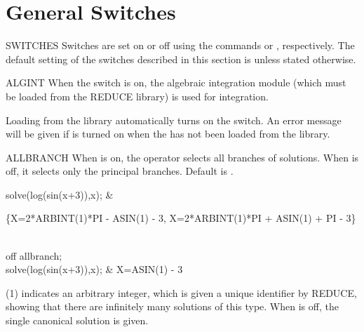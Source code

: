 \section{General Switches}

\begin{Introduction}{SWITCHES}
Switches are set on or off using the commands  or
, respectively.
The default setting of the switches described in this section is
 unless stated otherwise. 
\end{Introduction}

\begin{Switch}[algint]{ALGINT}
When the  switch is on, the algebraic integration module (which
must be loaded from the REDUCE library) is used for integration.

\begin{Comments}
Loading  from the library automatically turns on the
 switch.  An error message will be given if  is
turned on when the  has not been loaded from the library.
\end{Comments}
\end{Switch}


\begin{Switch}[allbranch]{ALLBRANCH}
When  is on, the operator  selects all 
branches of solutions. 
When  is off, it selects only the principal
branches.  Default is .

\begin{Examples}

solve(log(sin(x+3)),x);    &
\begin{multilineoutput}{6cm}
\{X=2*ARBINT(1)*PI - ASIN(1) - 3,
 X=2*ARBINT(1)*PI + ASIN(1) + PI - 3\}
\end{multilineoutput}\\
off allbranch; \\
solve(log(sin(x+3)),x);    &
                 {X=ASIN(1) - 3}
\end{Examples}

\begin{Comments}
(1) indicates an arbitrary integer, which is given a
unique identifier by REDUCE, showing that there are infinitely many
solutions of this type.  When  is off, the single
canonical solution is given.
\end{Comments}
\end{Switch}


